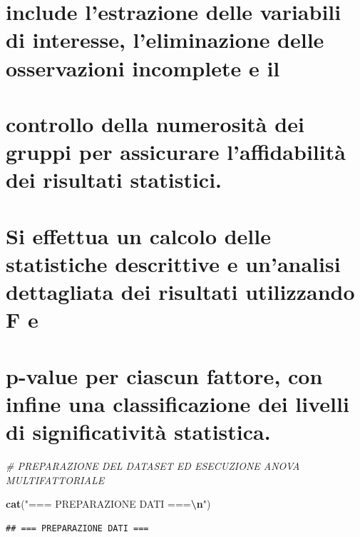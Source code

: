 \documentclass[
]{article}
\newenvironment{Shaded}{\begin{snugshade}}{\end{snugshade}}
\newcommand{\CommentTok}[1]{\textcolor[rgb]{0.56,0.35,0.01}{\textit{#1}}}
\newcommand{\FunctionTok}[1]{\textcolor[rgb]{0.13,0.29,0.53}{\textbf{#1}}}
\newcommand{\NormalTok}[1]{#1}
\newcommand{\SpecialCharTok}[1]{\textcolor[rgb]{0.81,0.36,0.00}{\textbf{#1}}}
\newcommand{\StringTok}[1]{\textcolor[rgb]{0.31,0.60,0.02}{#1}}
\begin{document}
\section{include l'estrazione delle variabili di interesse,
l'eliminazione delle osservazioni incomplete e
il}\label{include-lestrazione-delle-variabili-di-interesse-leliminazione-delle-osservazioni-incomplete-e-il}

\section{controllo della numerosità dei gruppi per assicurare
l'affidabilità dei risultati
statistici.}\label{controllo-della-numerosituxe0-dei-gruppi-per-assicurare-laffidabilituxe0-dei-risultati-statistici.}

\section{Si effettua un calcolo delle statistiche descrittive e
un'analisi dettagliata dei risultati utilizzando F
e}\label{si-effettua-un-calcolo-delle-statistiche-descrittive-e-unanalisi-dettagliata-dei-risultati-utilizzando-f-e}

\section{p-value per ciascun fattore, con infine una classificazione dei
livelli di significatività
statistica.}\label{p-value-per-ciascun-fattore-con-infine-una-classificazione-dei-livelli-di-significativituxe0-statistica.}

\begin{Shaded}
\begin{Highlighting}[]
\CommentTok{\# PREPARAZIONE DEL DATASET ED ESECUZIONE ANOVA MULTIFATTORIALE}

\FunctionTok{cat}\NormalTok{(}\StringTok{"=== PREPARAZIONE DATI ===}\SpecialCharTok{\textbackslash{}n}\StringTok{"}\NormalTok{)}
\end{Highlighting}
\end{Shaded}

\begin{verbatim}
## === PREPARAZIONE DATI ===
\end{verbatim}
\end{document}
